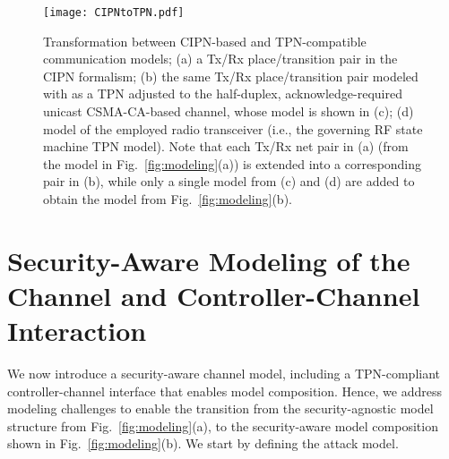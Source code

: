 
%
\begin{figure*}[t]
	\centering
	\texttt{[image: CIPNtoTPN.pdf]}
	\caption{Transformation between CIPN-based and TPN-compatible communication models; (a) a Tx/Rx place/transition pair in the CIPN formalism; (b) the same Tx/Rx place/transition pair modeled with as a TPN adjusted to the half-duplex, acknowledge-required unicast CSMA-CA-based channel, whose model is shown in (c); (d) model of the employed radio transceiver (i.e., the governing RF state machine TPN model). Note that each Tx/Rx net pair in (a) (from the model in Fig.~\ref{fig:modeling}(a)) is extended into a corresponding pair in (b), while only a single model from (c) and (d) are added to obtain the model from Fig.~\ref{fig:modeling}(b).}
	\label{fig:CIPNtoTPN}
\end{figure*}
%


\section{Security-Aware Modeling of the Channel  and Controller-Channel Interaction}
\label{subsec:channelAndCtrlChannelInteraction}

We now introduce a security-aware channel model, including a TPN-compliant controller-channel interface that enables model composition. Hence, we address modeling challenges to enable the transition from the security-agnostic model structure from Fig.~\ref{fig:modeling}(a), to the security-aware model composition shown in Fig.~\ref{fig:modeling}(b). We start by defining the attack model.

